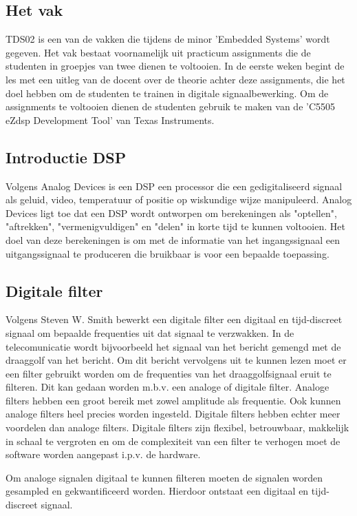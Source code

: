\documentclass[11pt,a4paper]{article}
\begin{document}
		\subsection{Het vak}
		TDS02 is een van de vakken die tijdens de minor 'Embedded Systems' wordt gegeven. Het vak bestaat voornamelijk uit practicum assignments die de studenten in groepjes van twee dienen te voltooien. In de eerste weken begint de les met een uitleg van de docent over de theorie achter deze assignments, die het doel hebben om de studenten te trainen in digitale signaalbewerking. Om de assignments te voltooien dienen de studenten gebruik te maken van de 'C5505 eZdsp Development Tool' van Texas Instruments.
		
		\subsection{Introductie DSP}
		Volgens Analog Devices \cite{analog} is een DSP een processor die een gedigitaliseerd signaal als geluid, video, temperatuur of positie op wiskundige wijze manipuleerd. Analog Devices ligt toe dat een DSP wordt ontworpen om berekeningen als "optellen", "aftrekken", "vermenigvuldigen" en "delen" in korte tijd te kunnen voltooien. Het doel van deze berekeningen is om met de informatie van het ingangssignaal een uitgangssignaal te produceren die bruikbaar is voor een bepaalde toepassing. 
		
		\subsection{Digitale filter}
		Volgens Steven W. Smith \cite{DSPguide} bewerkt een digitale filter een digitaal en tijd-discreet signaal om bepaalde frequenties uit dat signaal te verzwakken. In de telecomunicatie wordt bijvoorbeeld het signaal van het bericht gemengd met de draaggolf van het bericht. Om dit bericht vervolgens uit te kunnen lezen moet er een filter gebruikt worden om de frequenties van het draaggolfsignaal eruit te filteren. Dit kan gedaan worden m.b.v. een analoge of digitale filter. Analoge filters hebben een groot bereik met zowel amplitude als frequentie. Ook kunnen analoge filters heel precies worden ingesteld. Digitale filters hebben echter meer voordelen dan analoge filters. Digitale filters zijn flexibel, betrouwbaar, makkelijk in schaal te vergroten en om de complexiteit van een filter te verhogen moet de software worden aangepast i.p.v. de hardware. 
		
Om analoge signalen digitaal te kunnen filteren moeten de 	signalen worden gesampled en gekwantificeerd worden. Hierdoor ontstaat een digitaal en tijd-discreet signaal. 
\end{document}
